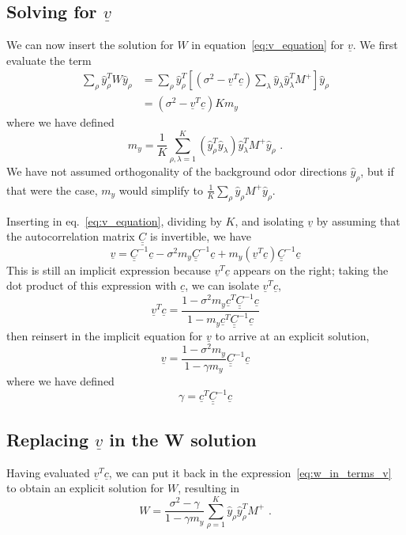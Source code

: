 \documentclass[letter, 12pt]{article}
\def\beq{ \begin{equation} }		%
\def\eeq{ \end{equation} } 			%
\newcommand{\dul}[1]{\underline{\underline{#1}}}
\begin{document}
\subsection{Solving for $\underline{v}$}
We can now insert the solution for $W$ in equation~\ref{eq:v_equation} for $\underline{v}$. We first evaluate the term
\begin{align*}
	\sum_{\rho} \hat{y}_{\rho}^T W \hat{y}_{\rho} &= \sum_{\rho} \hat{y}_{\rho}^T \left[(\sigma^2 - \underline{v}^T\underline{c}) \sum_{\lambda} \hat{y}_{\lambda} \hat{y}_{\lambda}^T M^+ \right] \hat{y}_{\rho} \\
	&= (\sigma^2 - \underline{v}^T \underline{c}) K m_y
\end{align*}
where we have defined
\beq
	m_y = \frac{1}{K} \sum_{\rho, \lambda=1}^K (\hat{y}_{\rho}^T \hat{y}_{\lambda}) \hat{y}_{\lambda}^T M^+ \hat{y}_{\rho} \,\, .
	\label{eq:m_y_def}
\eeq
We have not assumed orthogonality of the background odor directions $\hat{y}_{\rho}$, but if that were the case, $m_y$ would simplify to $\frac1K \sum_{\rho} \hat{y}_{\rho} M^+ \hat{y}_{\rho}$. 

Inserting in eq.~\eqref{eq:v_equation}, dividing by $K$, and isolating $\underline{v}$ by assuming that the autocorrelation matrix $\dul{C}$ is invertible, we have
\begin{equation*}
	\underline{v} = \dul{C}^{-1} \underline{c} - \sigma^2 m_y \dul{C}^{-1} \underline{c} + m_y (\underline{v}^T \underline{c}) \dul{C}^{-1} \underline{c}
\end{equation*}
This is still an implicit expression because $\underline{v}^T \underline{c}$ appears on the right; taking the dot product of this expression with $\underline{c}$, we can isolate $\underline{v}^T \underline{c}$, 
\begin{equation*}
	\underline{v}^T \underline{c} = \frac{1 - \sigma^2 m_y \underline{c}^T \dul{C}^{-1} \underline{c}}{1 - m_y \underline{c}^T \dul{C}^{-1} \underline{c}}
\end{equation*}
then reinsert in the implicit equation for $\underline{v}$ to arrive at an explicit solution, 
\beq
	\underline{v} = \frac{1 - \sigma^2 m_y }{1 - \gamma m_y} \dul{C}^{-1} \underline{c}
	\label{eq:v_solution}
\eeq
where we have defined
\beq
	\gamma = \underline{c}^T \dul{C}^{-1} \underline{c}
	\label{eq:gamma_def}
\eeq


\subsection{Replacing $\underline{v}$ in the W solution}
Having evaluated $\underline{v}^T \underline{c}$, we can put it back in the expression~\eqref{eq:w_in_terms_v} to obtain an explicit solution for $W$, resulting in
\beq
	W = \frac{\sigma^2 - \gamma}{1 - \gamma m_y} \sum_{\rho=1}^K \hat{y}_{\rho} \hat{y}_{\rho}^T M^+ \,\, .
	\label{eq:w_solution}
\eeq
\end{document}
